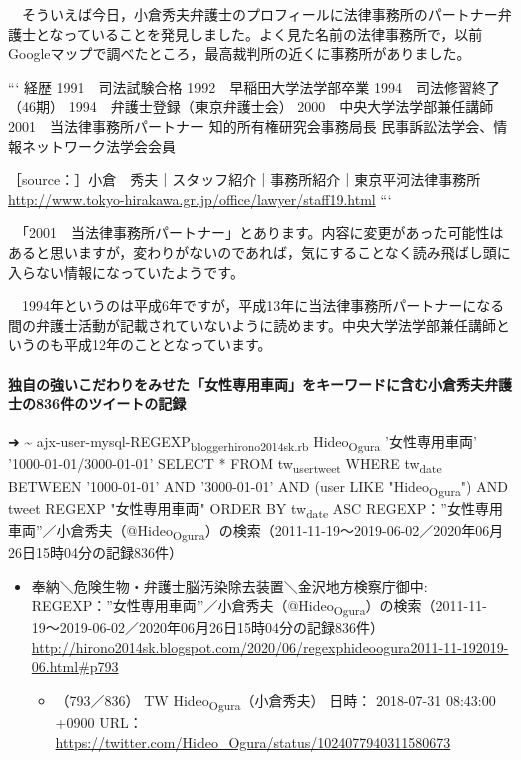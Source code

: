 \documentclass[]{ltjarticle}
\let\oldparagraph\paragraph
\renewcommand{\paragraph}[1]{\oldparagraph{#1}\mbox{}}
\begin{document}
　そういえば今日，小倉秀夫弁護士のプロフィールに法律事務所のパートナー弁護士となっていることを発見しました。よく見た名前の法律事務所で，以前Googleマップで調べたところ，最高裁判所の近くに事務所がありました。

```
経歴
1991　司法試験合格
1992　早稲田大学法学部卒業
1994　司法修習終了（46期）
1994　弁護士登録（東京弁護士会）
2000　中央大学法学部兼任講師
2001　当法律事務所パートナー
知的所有権研究会事務局長
民事訴訟法学会、情報ネットワーク法学会会員

［source：］小倉　秀夫｜スタッフ紹介｜事務所紹介｜東京平河法律事務所 \url{http://www.tokyo-hirakawa.gr.jp/office/lawyer/staff19.html}
```

　「2001　当法律事務所パートナー」とあります。内容に変更があった可能性はあると思いますが，変わりがないのであれば，気にすることなく読み飛ばし頭に入らない情報になっていたようです。

　1994年というのは平成6年ですが，平成13年に当法律事務所パートナーになる間の弁護士活動が記載されていないように読めます。中央大学法学部兼任講師というのも平成12年のこととなっています。

\paragraph{独自の強いこだわりをみせた「女性専用車両」をキーワードに含む小倉秀夫弁護士の836件のツイートの記録}
\label{sec:org8479075}

➜  \textasciitilde{} ajx-user-mysql-REGEXP\textsubscript{blogger}\textsubscript{hirono2014sk.rb} Hideo\textsubscript{Ogura} '女性専用車両' '1000-01-01/3000-01-01'
SELECT * FROM tw\textsubscript{user}\textsubscript{tweet} WHERE tw\textsubscript{date} BETWEEN '1000-01-01' AND '3000-01-01' AND (user LIKE "Hideo\textsubscript{Ogura}") AND  tweet REGEXP "女性専用車両"  ORDER BY tw\textsubscript{date} ASC
REGEXP：”女性専用車両”／小倉秀夫（@Hideo\textsubscript{Ogura}）の検索（2011-11-19〜2019-06-02／2020年06月26日15時04分の記録836件）

\begin{itemize}
\item 奉納＼危険生物・弁護士脳汚染除去装置＼金沢地方検察庁御中: REGEXP：”女性専用車両”／小倉秀夫（@Hideo\textsubscript{Ogura}）の検索（2011-11-19〜2019-06-02／2020年06月26日15時04分の記録836件） \url{http://hirono2014sk.blogspot.com/2020/06/regexphideoogura2011-11-192019-06.html\#p793}

\begin{itemize}
\item （793／836） TW Hideo\textsubscript{Ogura}（小倉秀夫） 日時： 2018-07-31 08:43:00 +0900 URL： \url{https://twitter.com/Hideo\_Ogura/status/1024077940311580673}
\end{itemize}
\end{itemize}
\end{document}
